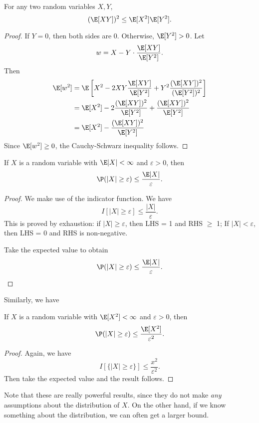 \documentclass[a4paper]{article}
\begin{document}
\begin{thm}
  For any two random variables $X, Y$,
  \[
    (\E[XY])^2 \leq \E[X^2]\E[Y^2].
  \]
\end{thm}

\begin{proof}
  If $Y = 0$, then both sides are $0$. Otherwise, $\E[Y^2] > 0$. Let
  \[
    w = X - Y\cdot \frac{\E[XY]}{\E[Y^2]}.
  \]
  Then
  \begin{align*}
    \E[w^2] &= \E\left[X^2 - 2XY\frac{\E[XY]}{\E[Y^2]} + Y^2\frac{(\E[XY])^2}{(\E[Y^2])^2}\right]\\
    &= \E[X^2] - 2\frac{(\E[XY])^2}{\E[Y^2]} + \frac{(\E[XY])^2}{\E[Y^2]}\\
    &= \E[X^2] - \frac{(\E[XY])^2}{\E[Y^2]}
  \end{align*}
  Since $\E[w^2] \geq 0$, the Cauchy-Schwarz inequality follows.
\end{proof}

\begin{thm}
  If $X$ is a random variable with $\E|X| < \infty$ and $\varepsilon > 0$, then
  \[
    \P(|X| \geq \varepsilon) \leq \frac{\E|X|}{\varepsilon}.
  \]
\end{thm}

\begin{proof}
  We make use of the indicator function. We have
  \[
    I[|X|\geq \varepsilon] \leq \frac{|X|}{\varepsilon}.
  \]
  This is proved by exhaustion: if $|X| \geq \varepsilon$, then LHS = 1 and RHS $\geq$ 1; If $|X| < \varepsilon$, then LHS = 0 and RHS is non-negative.

  Take the expected value to obtain
  \[
    \P(|X| \geq \varepsilon) \leq \frac{\E |X|}{\varepsilon}.
  \]
\end{proof}

Similarly, we have
\begin{thm}
  If $X$ is a random variable with $\E[X^2] < \infty$ and $\varepsilon > 0$, then
  \[
    \P(|X| \geq \varepsilon) \leq \frac{\E[X^2]}{\varepsilon^2}.
  \]
\end{thm}

\begin{proof}
  Again, we have
  \[
    I[\{|X|\geq \varepsilon\}] \leq \frac{x^2}{\varepsilon^2}.
  \]
  Then take the expected value and the result follows.
\end{proof}
Note that these are really powerful results, since they do not make \emph{any} assumptions about the distribution of $X$. On the other hand, if we know something about the distribution, we can often get a larger bound.
\end{document}
